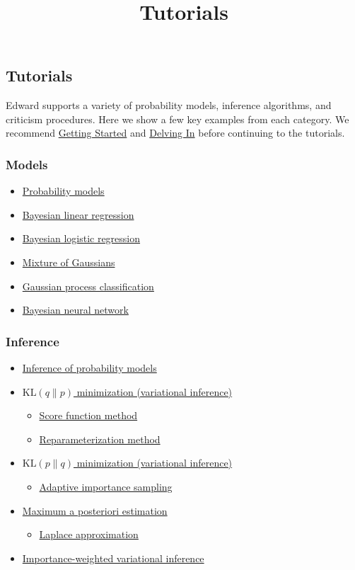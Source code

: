 \title{Tutorials}

\subsection{Tutorials}

Edward supports a variety of probability models, inference
algorithms, and criticism procedures. Here we show a few key examples from each
category. We recommend \href{getting-started.html}{Getting Started} and
\href{delving-in.html}{Delving In} before continuing to the tutorials.

\subsubsection{Models}

\begin{itemize}
\item \href{tut_model.html}{Probability models}
\item \href{tut_bayesian_linear_regression.html}{Bayesian linear regression}
\item \href{tut_bayesian_linear_regression.html}{Bayesian logistic regression}
\item \href{tut_mixture_gaussian.html}{Mixture of Gaussians}
\item \href{tut_gp_classification.html}{Gaussian process classification}
\item \href{tut_bayesian_nn.html}{Bayesian neural network}
\end{itemize}

\subsubsection{Inference}

\begin{itemize}
  \item \href{tut_inference.html}{Inference of probability models}
  \item \href{tut_KLqp.html}{$\text{KL}(q\|p)$ minimization (variational
  inference)}
  \begin{itemize}
    \item \href{tut_KLqp_score.html}{Score function method}
    \item \href{tut_KLqp_reparam.html}{Reparameterization method}
  \end{itemize}
  \item \href{tut_KLpq.html}{$\text{KL}(p\|q)$ minimization (variational
  inference)}
  \begin{itemize}
    \item \href{tut_KLpq_ais.html}{Adaptive importance sampling}
  \end{itemize}
  \item \href{tut_MAP.html}{Maximum a posteriori estimation}
  \begin{itemize}
    \item \href{tut_MAP_Laplace.html}{Laplace approximation}
  \end{itemize}
  \item \href{#}{Importance-weighted variational inference}
\end{itemize}


